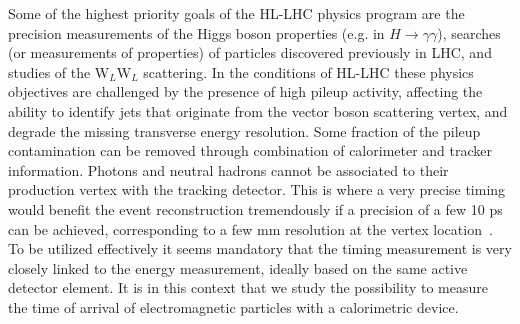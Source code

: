 \documentclass[12pt]{article}
\begin{document}



Some of the highest priority goals of the HL-LHC physics program are the
precision measurements of the Higgs boson properties (e.g. in
$H\to\gamma\gamma$), searches (or measurements of properties) of particles
discovered previously in LHC, and studies of the W$_L$W$_L$ scattering. In the
conditions of HL-LHC these physics objectives are challenged by the presence of
high pileup activity, affecting the ability to identify jets that originate from
the vector boson scattering vertex, and degrade the missing transverse energy
resolution. Some fraction of the pileup contamination can be removed through
combination of calorimeter and tracker information. Photons and neutral
hadrons cannot be associated to their production vertex with the tracking
detector. This is where a very precise timing would benefit the event
reconstruction tremendously if a precision of a few 10 ps can be achieved,
corresponding to a few mm resolution at the vertex location~\cite{AdiCalor14}.
To be utilized effectively it seems mandatory that the timing measurement is
very closely linked to the energy measurement, ideally based on the same active
detector element. It is in this context that we study the possibility to measure
the time of arrival of electromagnetic particles with a calorimetric device.
\end{document}
